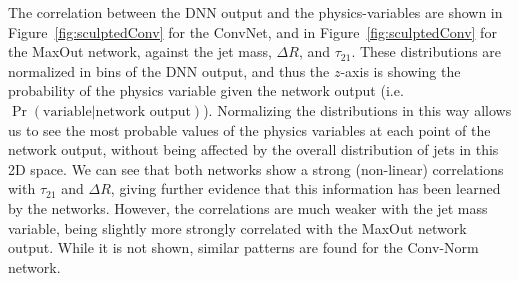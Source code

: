 The correlation between the DNN output and the physics-variables are shown in Figure~\ref{fig:sculptedConv} for the ConvNet, and in Figure~\ref{fig:sculptedConv} for the MaxOut network,  against the jet mass, $\Delta R$, and $\tau_{21}$.   These distributions are normalized in bins of the DNN output, and thus the $z$-axis is showing the probability of the physics variable given the network output (i.e. $\Pr(\text{variable}|\text{network output})$). Normalizing the distributions in this way allows us to see the most probable values of the physics variables at each point of the network output, without being affected by the overall distribution of jets in this 2D space.  We can see that both networks show a strong (non-linear) correlations with $\tau_{21}$ and $\Delta R$, giving further evidence that this information has been learned by the networks.  However, the correlations are much weaker with the jet mass variable, being slightly more strongly correlated with the MaxOut network output.  While it is not shown, similar patterns are found for the Conv-Norm network.
